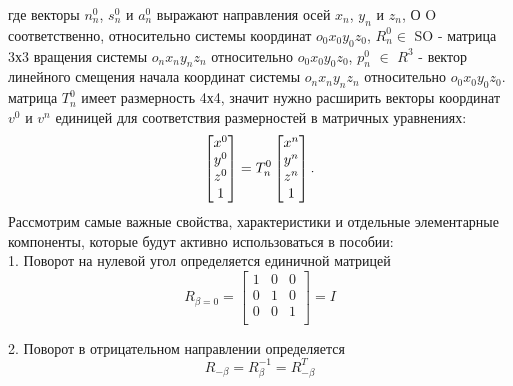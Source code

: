 \hspace*{\parindent} где векторы  $n_n^0$,  $s_n^0$ и $a_n^0$ выражают направления осей $x_n$, $y_n$ и $z_n$, О O соответственно, относительно системы координат $o_0 x_0 y_0 z_0$, $R_n^0 \in$ SO - матрица 3х3 вращения системы  $o_n x_n y_n z_n$ относительно $o_0 x_0 y_0 z_0$, $p_n^0$ $\in$ $R^3$ - вектор линейного смещения начала координат системы  $o_n x_n y_n z_n$ относительно $o_0 x_0 y_0 z_0$.\\
\hspace*{\parindent} матрица $T_n^0$ имеет размерность 4х4, значит нужно расширить векторы координат $v^0$ и $v^n$ единицей для соответствия размерностей в матричных уравнениях:\\
\begin{equation*}\label{eq:model}
     \begin{bmatrix}
     x^0 \\
     y^0\\
     z^0\\
     1\\
    \end{bmatrix}
     =T_n^0
     \begin{bmatrix}
     x^n \\
     y^n\\
     z^n\\
     1\\
    \end{bmatrix}
    .\\
\end{equation*} 
\newpage 
\hspace*{\parindent} Рассмотрим самые важные свойства, характеристики и отдельные элементарные компоненты, которые будут активно использоваться в пособии:\\

1. Поворот на нулевой угол определяется единичной матрицей\\
\begin{equation*}\label{eq:model}
R_{\beta=0} = 
     \begin{bmatrix}
    1 & 0 & 0\\
    0 & 1 & 0\\
    0 & 0 & 1\\
    \end{bmatrix}
     =I
\end{equation*} 

2. Поворот в отрицательном направлении определяется
\begin{equation*}\label{eq:model}
R_{-\beta} = R_{\beta}^{-1} = R_{-\beta}^T
\end{equation*} 


